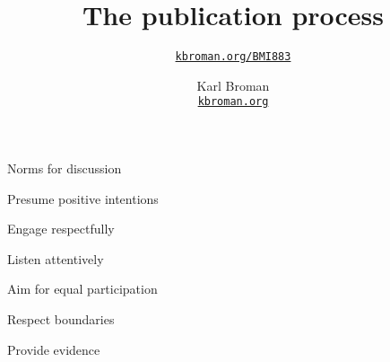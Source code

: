 \documentclass[aspectratio=169,12pt,t]{beamer}
\title{The publication process}
\subtitle{}
\author{\href{https://kbroman.org/BMI883}{\tt kbroman.org/BMI883} }
\institute{}
\date{\small \hspace{3in} Karl Broman \\
  \hspace{3in} \href{https://kbroman.org}{\color{foreground}
    \small \tt kbroman.org}}
\begin{document}
{
\frame{
  \titlepage
} }




\begin{frame}{Norms for discussion}

      \bbi
    \item Presume positive intentions
    \item Engage respectfully
    \item Listen attentively
    \item Aim for equal participation
    \item Respect boundaries
    \item Provide evidence
      \ei


\end{frame}
\end{document}

